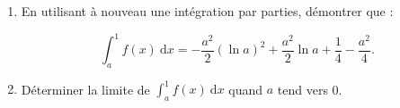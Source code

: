 \documentclass[10pt]{article}
\begin{document}
\begin{enumerate}
\begin{enumerate}
\[\displaystyle\int_a^1 f(x)\: \text{d}x = - \dfrac{a^2}{2}(\ln a)^2 - \displaystyle\int_a^1 x \ln x\: \text{d}x.\]

		\item En utilisant à nouveau une intégration par parties, démontrer que :

\[\displaystyle\int_a^1 f(x)\: \text{d}x =  - \dfrac{a^2}{2}(\ln a)^2 + \dfrac{a^2}{2} \ln a + \dfrac14 - \dfrac{a^2}{4}.\]

		\item Déterminer la limite de $\displaystyle\int_a^1 f(x)\: \text{d}x$ quand $a$ tend vers 0.
	\end{enumerate}
\end{enumerate}
\end{document}
